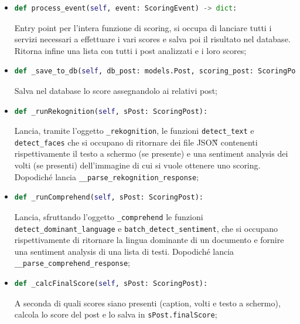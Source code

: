 \begin{itemize}
\item 
\begin{lstlisting}[language=Python, numbers=none]
def process_event(self, event: ScoringEvent) -> dict:
\end{lstlisting}
Entry point per l'intera funzione di scoring, si occupa di lanciare tutti i servizi 
necessari a effettuare i vari scores e salva poi il risultato nel database. 
Ritorna infine una lista con tutti i post analizzati e i loro scores;

\item 
\begin{lstlisting}[language=Python, numbers=none]
def _save_to_db(self, db_post: models.Post, scoring_post: ScoringPost):
\end{lstlisting}
Salva nel database lo score assegnandolo ai relativi post;

\item 
\begin{lstlisting}[language=Python, numbers=none]
def _runRekognition(self, sPost: ScoringPost):
\end{lstlisting}
Lancia, tramite l'oggetto \verb+_rekognition+, le funzioni \verb+detect_text+ e 
\verb+detect_faces+ che si occupano di ritornare dei file JSON\G{} contenenti rispettivamente 
il testo a schermo (se presente) e una sentiment analysis dei volti (se presenti) 
dell'immagine di cui si vuole ottenere uno scoring. 
Dopodiché lancia \verb+__parse_rekognition_response+;

\item 
\begin{lstlisting}[language=Python, numbers=none]
def _runComprehend(self, sPost: ScoringPost):
\end{lstlisting}
Lancia, sfruttando l'oggetto \verb+_comprehend+ le funzioni \verb+detect_dominant_language+ 
e \verb+batch_detect_sentiment+, che si occupano rispettivamente di ritornare la lingua 
dominante di un documento e fornire una sentiment analysis di una lista di testi.
Dopodiché  lancia \verb+__parse_comprehend_response+;

\item 
\begin{lstlisting}[language=Python, numbers=none]
def _calcFinalScore(self, sPost: ScoringPost):
\end{lstlisting}
A seconda di quali scores siano presenti (caption, volti e testo a schermo), calcola 
lo score del post e lo salva in \verb+sPost.finalScore+;
   


\end{itemize}
